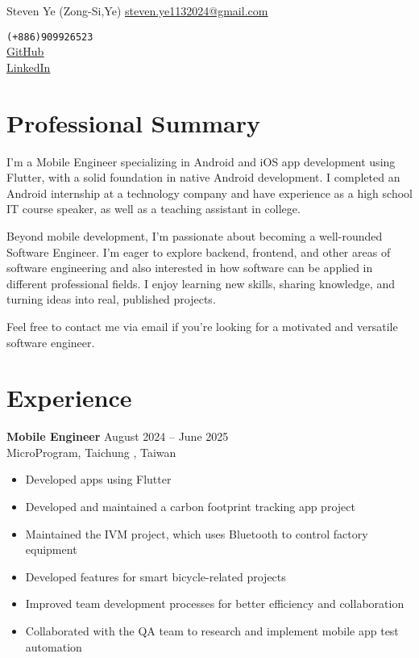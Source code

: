 \documentclass[a4paper,10pt]{article}
\makeatletter
\def\Name{Steven Ye (Zong-Si,Ye)}
\def\Email{steven.ye1132024@gmail.com}
\def\Phone{(+886)909926523}
\def\LinkedIn{https://www.linkedin.
com/in/\%E5\%AE\%97\%E7\%BE\%B2-\%E8\%91\%89-369b7528b/}
\def\GitHub{https://github.com/qaz5823091}
\makeatother
\begin{document}
\begin{center}
    {\huge \Name} \hfill
    \href{mailto:\Email}{\underline{\Email}} \hfill \\
\end{center}

\begin{flushright}
    \texttt{\Phone} \\
    \underline{\href{\GitHub}{GitHub}} \\
    \underline{\href{\LinkedIn}{LinkedIn}}
\end{flushright}

\section*{Professional Summary}
I'm a Mobile Engineer specializing in Android and iOS app development using Flutter, with a solid foundation in native Android development. I completed an Android internship at a technology company and have experience as a high school IT course speaker, as well as a teaching assistant in college.

Beyond mobile development, I'm passionate about becoming a well-rounded Software Engineer. I'm eager to explore backend, frontend, and other areas of software engineering and also interested in how software can be applied in different professional fields. I enjoy learning new skills, sharing knowledge, and turning ideas into real, published projects.

Feel free to contact me via email if you're looking for a motivated and versatile software engineer.


\section*{Experience}
\textbf{Mobile Engineer} \hfill August 2024 -- June 2025 \\
MicroProgram, Taichung , Taiwan
\begin{itemize}[left=0pt, label={--}]
    \item Developed apps using Flutter
    \item Developed and maintained a carbon footprint tracking app project
    \item Maintained the IVM project, which uses Bluetooth to control factory equipment
    \item Developed features for smart bicycle-related projects
    \item Improved team development processes for better efficiency and collaboration
    \item Collaborated with the QA team to research and implement mobile app test automation
\end{itemize}
\end{document}
